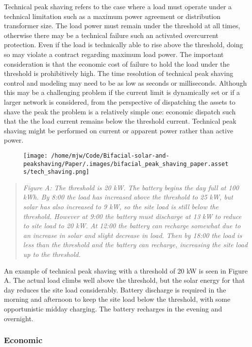 \documentclass[
]{article}
\begin{document}
Technical peak shaving refers to the case where a load must operate
under a technical limitation such as a maximum power agreement or
distribution transformer size. The load power must remain under the
threshold at all times, otherwise there may be a technical failure such
an activated overcurrent protection. Even if the load is technically
able to rise above the threshold, doing so may violate a contract
regarding maximum load power. The important consideration is that the
economic cost of failure to hold the load under the threshold is
prohibitively high. The time resolution of technical peak shaving
control and modeling may need to be as low as seconds or milliseconds.
Although this may be a challenging problem if the current limit is
dynamically set or if a larger network is considered, from the
perspective of dispatching the assets to shave the peak the problem is a
relatively simple one: economic dispatch such that the the load current
remains below the threshold current. Technical peak shaving might be
performed on current or apparent power rather than active power.

\begin{figure}
\centering
\texttt{[image: /home/mjw/Code/Bifacial-solar-and-peakshaving/Paper/.images/bifacial\_peak\_shaving\_paper.assets/tech\_shaving.png]}
\caption{}
\end{figure}

\begin{quote}
\emph{Figure A: The threshold is 20 kW. The battery begins the day full
at 100 kWh. By 8:00 the load has increased above the threshold to 25 kW,
but solar has also increased to 9 kW, so the site load is still below
the threshold. However at 9:00 the battery must discharge at 13 kW to
reduce to site load to 20 kW. At 12:00 the battery can recharge somewhat
due to an increase in solar and slight decrease in load. Then by 18:00
the load is less than the threshold and the battery can recharge,
increasing the site load up to the threshold.}
\end{quote}

An example of technical peak shaving with a threshold of 20 kW is seen
in Figure A. The actual load climbs well above the threshold, but the
solar energy for that day reduces the site load considerably. Battery
discharge is required in the morning and afternoon to keep the site load
below the threshold, with some opportunistic midday charging. The
battery recharges in the evening and overnight.

\hypertarget{economic}{%
\subsubsection{Economic}\label{economic}}
\end{document}
